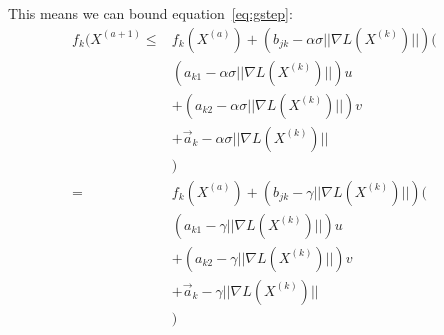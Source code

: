 This means we can bound equation~\ref{eq:gstep}:
\newcommand{\grd}{||\nabla L(X^{(k)})||}
\begin{align}
    f_k(X^{(a+1)} \leq& f_k(X^{(a)}) + (b_{jk} - \alpha \sigma \grd) (& \nonumber \\
                      & (a_{k1} - \alpha \sigma\grd)u \nonumber \\
                      &+ (a_{k2} - \alpha \sigma\grd)v \nonumber \\
                      &+ \vec{a}_{k} - \alpha \sigma \grd\nonumber \nonumber \\
                      &) \\
                      =&  f_k(X^{(a)}) + (b_{jk} - \gamma \grd) (& \nonumber \\
                      & (a_{k1} - \gamma \grd)u \nonumber \\
                      &+ (a_{k2} - \gamma \grd)v \nonumber \\
                      &+ \vec{a}_{k} - \gamma \grd\nonumber \nonumber \\
                      &)
\end{align}














